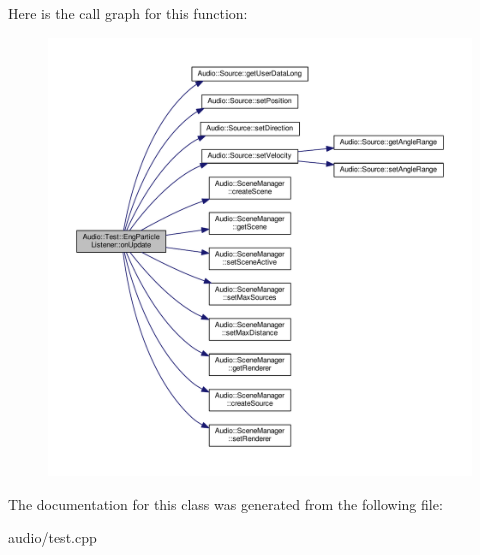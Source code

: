 Here is the call graph for this function\+:
\nopagebreak
\begin{figure}[H]
\begin{center}
\leavevmode
\includegraphics[width=350pt]{da/d16/classAudio_1_1Test_1_1EngParticleListener_a9d18798d9a8565b367f65350268b26be_cgraph}
\end{center}
\end{figure}




The documentation for this class was generated from the following file\+:\begin{DoxyCompactItemize}
\item 
audio/test.\+cpp\end{DoxyCompactItemize}
